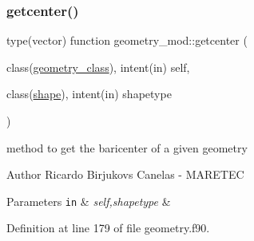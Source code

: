 \subsubsection{\texorpdfstring{getcenter()}{getcenter()}}
{\footnotesize\ttfamily type(vector) function geometry\+\_\+mod\+::getcenter (\begin{DoxyParamCaption}\item[{class(\mbox{\hyperlink{structgeometry__mod_1_1geometry__class}{geometry\+\_\+class}}), intent(in)}]{self,  }\item[{class(\mbox{\hyperlink{structgeometry__mod_1_1shape}{shape}}), intent(in)}]{shapetype }\end{DoxyParamCaption})\hspace{0.3cm}{\ttfamily [private]}}



method to get the baricenter of a given geometry 

\begin{DoxyAuthor}{Author}
Ricardo Birjukovs Canelas -\/ M\+A\+R\+E\+T\+EC 
\end{DoxyAuthor}

\begin{DoxyParams}[1]{Parameters}
\mbox{\tt in}  & {\em self,shapetype} & \\
\hline
\end{DoxyParams}


Definition at line 179 of file geometry.\+f90.


